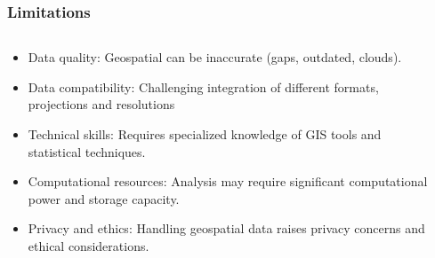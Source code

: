 \documentclass[xcolor=x11names,aspectratio=169, compress]{beamer}
\renewcommand{\(}{\begin{columns}}
\renewcommand{\)}{\end{columns}}
\newcommand{\<}[1]{\begin{column}{#1}}
\renewcommand{\>}{\end{column}}
\begin{document}
\begin{frame}
\begin{columns}[T]
\begin{column}{0.4\textwidth}
\begin{itemize}
        \end{itemize}
        \end{column}
    \end{columns}
\end{frame}


\begin{frame}
    \frametitle{Limitations}
    \begin{columns}[T]
        \begin{column}{0.7\textwidth}
            \begin{itemize}[<+->]
                \item Data quality: Geospatial can be inaccurate (gaps, outdated, clouds).
                \item Data compatibility: Challenging  integration of different formats, projections and resolutions
                \item Technical skills: Requires specialized knowledge of GIS tools and statistical techniques.
                \item Computational resources: Analysis may require significant computational power and storage capacity.
                \item Privacy and ethics: Handling geospatial data raises privacy concerns and ethical considerations.
            \end{itemize}
        \end{column}
        \begin{column}{0.3\textwidth}

\end{column}
\end{columns}
\end{frame}
\end{document}
